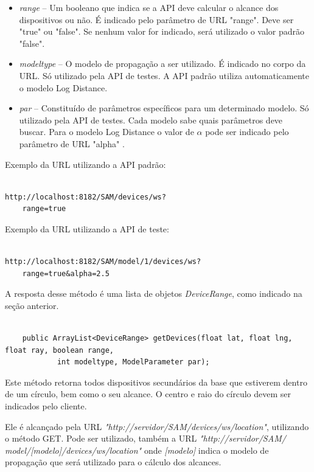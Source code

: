 \begin{itemize}
\item \textit{range} -- Um booleano que indica se a API deve calcular o alcance dos dispositivos ou não. É indicado pelo parâmetro de URL "range". Deve ser "true" ou "false". Se nenhum valor for indicado, será utilizado o valor padrão "false".
\item \textit{modeltype} -- O modelo de propagação a ser utilizado. É indicado no corpo da URL. Só utilizado pela API de testes. A API padrão utiliza automaticamente o modelo Log Distance.
\item \textit{par} -- Constituído de parâmetros específicos para um determinado modelo. Só utilizado pela API de testes. Cada modelo sabe quais parâmetros deve buscar. Para o modelo Log Distance o valor de \begin{math} \alpha \end{math} pode ser indicado pelo parâmetro de URL "alpha" .
\end{itemize}

Exemplo da URL utilizando a API padrão:

\begin{lstlisting}	

http://localhost:8182/SAM/devices/ws?
	range=true

\end{lstlisting}

Exemplo da URL utilizando a API de teste:

\begin{lstlisting}			

http://localhost:8182/SAM/model/1/devices/ws?
	range=true&alpha=2.5

\end{lstlisting}


A resposta desse método é uma lista de objetos \textit{DeviceRange}, como indicado na seção anterior.


\begin{lstlisting}

	public ArrayList<DeviceRange> getDevices(float lat, float lng, float ray, boolean range, 
			int modeltype, ModelParameter par);

\end{lstlisting}

Este método retorna todos dispositivos secundários da base que estiverem dentro de um círculo, bem como o seu alcance. O centro e raio do círculo devem ser indicados pelo cliente.

Ele é alcançado pela URL \textit{"http://servidor/SAM/devices/ws/location"}, utilizando o método GET. Pode ser utilizado, também a URL \textit{"http://servidor/SAM/ model/[modelo]/devices/ws/location"} onde \textit{[modelo]} indica o modelo de propagação que será utilizado para o cálculo dos alcances.

